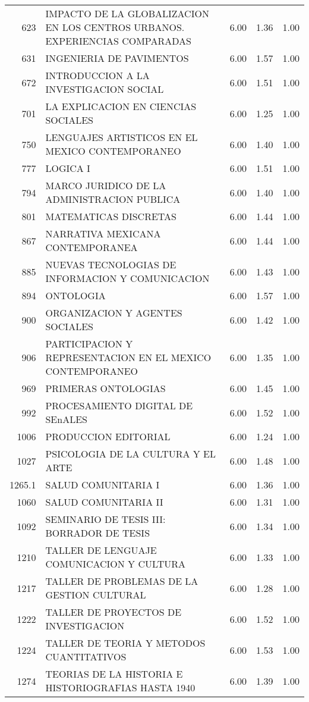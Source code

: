 \documentclass[12pt]{article}
\begin{document}
\begin{table}[ht]
\begin{tabular}{rlrrr}
  623 & IMPACTO DE LA GLOBALIZACION EN LOS CENTROS URBANOS. EXPERIENCIAS COMPARADAS & 6.00 & 1.36 & 1.00 \\ 
  631 & INGENIERIA DE PAVIMENTOS & 6.00 & 1.57 & 1.00 \\ 
  672 & INTRODUCCION A LA INVESTIGACION SOCIAL & 6.00 & 1.51 & 1.00 \\ 
  701 & LA EXPLICACION EN CIENCIAS SOCIALES & 6.00 & 1.25 & 1.00 \\ 
  750 & LENGUAJES ARTISTICOS EN EL MEXICO CONTEMPORANEO & 6.00 & 1.40 & 1.00 \\ 
  777 & LOGICA I & 6.00 & 1.51 & 1.00 \\ 
  794 & MARCO JURIDICO DE LA ADMINISTRACION PUBLICA & 6.00 & 1.40 & 1.00 \\ 
  801 & MATEMATICAS DISCRETAS & 6.00 & 1.44 & 1.00 \\ 
  867 & NARRATIVA MEXICANA CONTEMPORANEA & 6.00 & 1.44 & 1.00 \\ 
  885 & NUEVAS TECNOLOGIAS DE INFORMACION Y COMUNICACION & 6.00 & 1.43 & 1.00 \\ 
  894 & ONTOLOGIA & 6.00 & 1.57 & 1.00 \\ 
  900 & ORGANIZACION Y AGENTES SOCIALES & 6.00 & 1.42 & 1.00 \\ 
  906 & PARTICIPACION Y REPRESENTACION EN EL MEXICO CONTEMPORANEO & 6.00 & 1.35 & 1.00 \\ 
  969 & PRIMERAS ONTOLOGIAS & 6.00 & 1.45 & 1.00 \\ 
  992 & PROCESAMIENTO DIGITAL DE SEnALES & 6.00 & 1.52 & 1.00 \\ 
  1006 & PRODUCCION EDITORIAL & 6.00 & 1.24 & 1.00 \\ 
  1027 & PSICOLOGIA DE LA CULTURA Y EL ARTE & 6.00 & 1.48 & 1.00 \\ 
  1265.1 & SALUD COMUNITARIA I & 6.00 & 1.36 & 1.00 \\ 
  1060 & SALUD COMUNITARIA II & 6.00 & 1.31 & 1.00 \\ 
  1092 & SEMINARIO DE TESIS III: BORRADOR DE TESIS & 6.00 & 1.34 & 1.00 \\ 
  1210 & TALLER DE LENGUAJE COMUNICACION Y CULTURA & 6.00 & 1.33 & 1.00 \\ 
  1217 & TALLER DE PROBLEMAS DE LA GESTION CULTURAL & 6.00 & 1.28 & 1.00 \\ 
  1222 & TALLER DE PROYECTOS DE INVESTIGACION & 6.00 & 1.52 & 1.00 \\ 
  1224 & TALLER DE TEORIA Y METODOS CUANTITATIVOS & 6.00 & 1.53 & 1.00 \\ 
  1274 & TEORIAS DE LA HISTORIA E HISTORIOGRAFIAS HASTA 1940 & 6.00 & 1.39 & 1.00 \\ 

\end{tabular}
\end{table}
\end{document}
